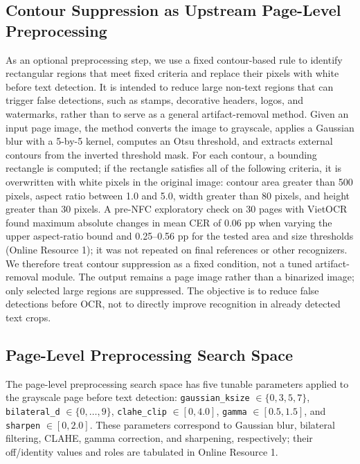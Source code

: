 \documentclass[pdflatex,sn-basic,Numbered,iicol]{sn-jnl}
\begin{document}
\subsection{Contour Suppression as Upstream Page-Level Preprocessing}

As an optional preprocessing step, we use a fixed contour-based rule to identify rectangular regions that meet fixed criteria and replace their pixels with white before text detection. It is intended to reduce large non-text regions that can trigger false detections, such as stamps, decorative headers, logos, and watermarks, rather than to serve as a general artifact-removal method. Given an input page image, the method converts the image to grayscale, applies a Gaussian blur with a 5-by-5 kernel, computes an Otsu threshold, and extracts external contours from the inverted threshold mask. For each contour, a bounding rectangle is computed; if the rectangle satisfies all of the following criteria, it is overwritten with white pixels in the original image: contour area greater than 500 pixels, aspect ratio between 1.0 and 5.0, width greater than 80 pixels, and height greater than 30 pixels. A pre-NFC exploratory check on 30 pages with VietOCR found maximum absolute changes in mean CER of 0.06 pp when varying the upper aspect-ratio bound and 0.25--0.56 pp for the tested area and size thresholds (Online Resource 1); it was not repeated on final references or other recognizers. We therefore treat contour suppression as a fixed condition, not a tuned artifact-removal module. The output remains a page image rather than a binarized image; only selected large regions are suppressed. The objective is to reduce false detections before OCR, not to directly improve recognition in already detected text crops.

\subsection{Page-Level Preprocessing Search Space}

The page-level preprocessing search space has five tunable parameters applied to the grayscale page before text detection: \texttt{gaussian\_ksize} $\in \{0,3,5,7\}$, \texttt{bilateral\_d} $\in \{0,\ldots,9\}$, \texttt{clahe\_clip} $\in [0,4.0]$, \texttt{gamma} $\in [0.5,1.5]$, and \texttt{sharpen} $\in [0,2.0]$. These parameters correspond to Gaussian blur, bilateral filtering, CLAHE, gamma correction, and sharpening, respectively; their off/identity values and roles are tabulated in Online Resource 1.
\end{document}
